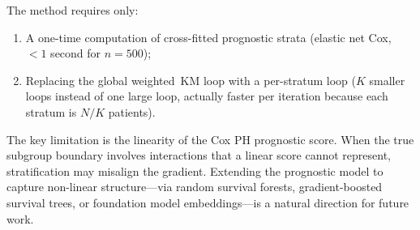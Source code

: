 \documentclass[11pt,letterpaper]{article}
\begin{document}
The method requires only:
\begin{enumerate}
  \item A one-time computation of cross-fitted prognostic strata
        (elastic net Cox, $< 1$ second for $n = 500$);
  \item Replacing the global weighted~KM loop with a per-stratum loop
        ($K$ smaller loops instead of one large loop, actually faster
        per iteration because each stratum is $N/K$ patients).
\end{enumerate}

The key limitation is the linearity of the Cox PH prognostic score.
When the true subgroup boundary involves interactions that a linear
score cannot represent, stratification may misalign the gradient.
Extending the prognostic model to capture non-linear structure---via
random survival forests, gradient-boosted survival trees, or foundation
model embeddings---is a natural direction for future work.
\end{document}
